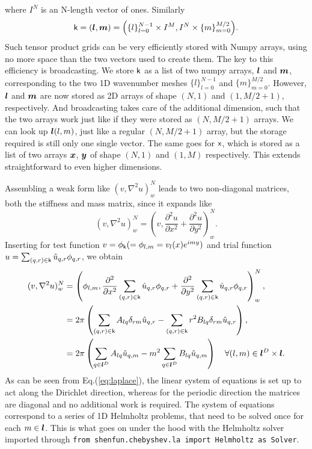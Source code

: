 \documentclass[%
oneside,                 %
final,                   %
10pt]{article}
\begin{document}
where $I^N$ is an N-length vector of ones. Similarly
\begin{equation}
\boldsymbol{\textsf{k}} = (\boldsymbol{l}, \boldsymbol{m}) = \Big(\{ l \}_{l=0}^{N-1} \times I^M,  I^N \times \{ m \}_{m=0}^{M/2} \Big). 
\end{equation}
Such tensor product grids can be very efficiently stored with Numpy arrays, using no more space than the two vectors used to create them. The key to this efficiency is broadcasting. We store $\boldsymbol{\textsf{k}}$ as a list of two numpy arrays, $\boldsymbol{l}$ and $\boldsymbol{m}$, corresponding to the two 1D wavenumber meshes $\{ l \}_{l=0}^{N-1}$ and $\{ m \}_{m=0}^{M/2}$. 
However, $\boldsymbol{l}$ and $\boldsymbol{m}$ are now stored as 2D arrays of shape $(N, 1)$ and $(1, M/2+1)$, respectively. And broadcasting takes care of the additional dimension, such that the two arrays work just like if they were stored as $(N, M/2+1)$ arrays. We can look up $\boldsymbol{l}(l, m)$, just like a regular $(N, M/2+1)$ array, but the storage required is still only one single vector. 
The same goes for $\boldsymbol{\textsf{x}}$, which is stored as a list of two arrays $\boldsymbol{x}$, $\boldsymbol{y}$ of shape $(N, 1)$ and $(1, M)$ respectively. This extends straightforward to even higher dimensions. 

Assembling a weak form like $(v, \nabla^2 u)_w^N$ leads to two non-diagonal matrices, both the stiffness and mass matrix, since it expands like
\begin{equation}
(v, \nabla^2 u)_w^N = \left(v, \frac{\partial^2 u}{\partial x^2} + \frac{\partial^2 u}{\partial y^2} \right)_w^N.
\end{equation}
Inserting for test function $v = \phi_{\boldsymbol{\textsf{k}}} (= \phi_{l, m} =v_l(x) e^{imy})$ and trial function $u = \sum_{(q,r)\in \boldsymbol{\textsf{k}}} \hat{u}_{q, r} \phi_{q,r}$, we obtain
\begin{align}
 (v, \nabla^2 u)_w^N &= \left(\phi_{l, m}, \frac{\partial^2}{\partial x^2} \sum_{(q, r) \in \boldsymbol{\textsf{k}}} \hat{u}_{q, r} \phi_{q, r} + \frac{\partial^2}{\partial y^2} \sum_{(q,r) \in \boldsymbol{\textsf{k}}} \hat{u}_{q, r} \phi_{q, r} \right)_w^N, \\
 &= 2\pi \left(\sum_{(q, r) \in \boldsymbol{\textsf{k}}} A_{lq} \delta_{rm} \hat{u}_{q,r} -  \sum_{(q, r) \in \boldsymbol{\textsf{k}}} {r}^2  B_{lq} \delta_{rm} \hat{u}_{q,r}\right), \\
 &= 2\pi \left(\sum_{q\in \boldsymbol{l}^D} A_{lq} \hat{u}_{q,m} - {m}^2 \sum_{q\in \boldsymbol{l}^D}  B_{lq} \hat{u}_{q,m}\right) \quad \forall (l, m) \in \boldsymbol{l}^D \times \boldsymbol{l}. \label{eq:laplace}
\end{align}
As can be seen from Eq.(\ref{eq:laplace}), the linear system of equations is set up to act along the Dirichlet direction, whereas for the periodic direction the matrices are diagonal and no additional work is required. The system of equations correspond to a series of 1D Helmholtz problems, that need to be solved once for each $m \in \boldsymbol{l}$. This is what goes on under the hood with the Helmholtz solver imported through \texttt{from shenfun.chebyshev.la import Helmholtz as Solver}.
\end{document}
